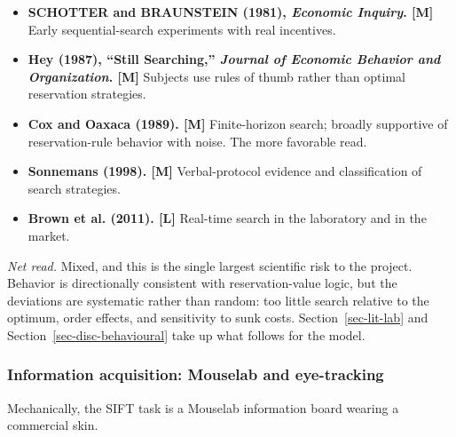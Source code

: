 \documentclass[
  letterpaper,
  DIV=11,
  numbers=noendperiod]{scrartcl}
\providecommand{\tightlist}{%
  \setlength{\itemsep}{0pt}\setlength{\parskip}{0pt}}
\begin{document}
\begin{itemize}
\tightlist
\item
  \textbf{SCHOTTER and BRAUNSTEIN (1981), \emph{Economic Inquiry}.
  {[}M{]}} Early sequential-search experiments with real incentives.
\item
  \textbf{Hey (1987), ``Still Searching,'' \emph{Journal of Economic
  Behavior and Organization}. {[}M{]}} Subjects use rules of thumb
  rather than optimal reservation strategies.
\item
  \textbf{Cox and Oaxaca (1989). {[}M{]}} Finite-horizon search; broadly
  supportive of reservation-rule behavior with noise. The more favorable
  read.
\item
  \textbf{Sonnemans (1998). {[}M{]}} Verbal-protocol evidence and
  classification of search strategies.
\item
  \textbf{Brown et al. (2011). {[}L{]}} Real-time search in the
  laboratory and in the market.
\end{itemize}

\emph{Net read.} Mixed, and this is the single largest scientific risk
to the project. Behavior is directionally consistent with
reservation-value logic, but the deviations are systematic rather than
random: too little search relative to the optimum, order effects, and
sensitivity to sunk costs. Section~\ref{sec-lit-lab} and
Section~\ref{sec-disc-behavioural} take up what follows for the model.

\subsubsection{Information acquisition: Mouselab and
eye-tracking}\label{information-acquisition-mouselab-and-eye-tracking}

Mechanically, the SIFT task is a Mouselab information board wearing a
commercial skin.
\end{document}
